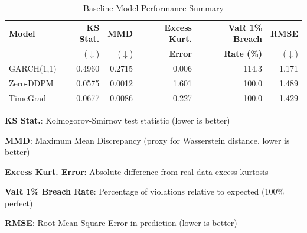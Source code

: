
\begin{table}[htbp]
\centering
\caption{Baseline Model Performance Summary}
\label{tab:baseline_performance}
\begin{tabular}{lrrrrr}
\toprule
\textbf{Model} & \textbf{KS Stat.} & \textbf{MMD} & \textbf{Excess Kurt.} & \textbf{VaR 1\% Breach} & \textbf{RMSE} \\
 & (\(\downarrow\)) & (\(\downarrow\)) & \textbf{Error} & \textbf{Rate (\%)} & (\(\downarrow\)) \\
\midrule
GARCH(1,1) & 0.4960 & 0.2715 & 0.006 & 114.3 & 1.171 \\
Zero-DDPM & 0.0575 & 0.0012 & 1.601 & 100.0 & 1.489 \\
TimeGrad & 0.0677 & 0.0086 & 0.227 & 100.0 & 1.429 \\
\bottomrule
\end{tabular}
\begin{tablenotes}
\small
\item \textbf{KS Stat.}: Kolmogorov-Smirnov test statistic (lower is better)
\item \textbf{MMD}: Maximum Mean Discrepancy (proxy for Wasserstein distance, lower is better)
\item \textbf{Excess Kurt. Error}: Absolute difference from real data excess kurtosis
\item \textbf{VaR 1\% Breach Rate}: Percentage of violations relative to expected (100\% = perfect)
\item \textbf{RMSE}: Root Mean Square Error in prediction (lower is better)
\end{tablenotes}
\end{table}